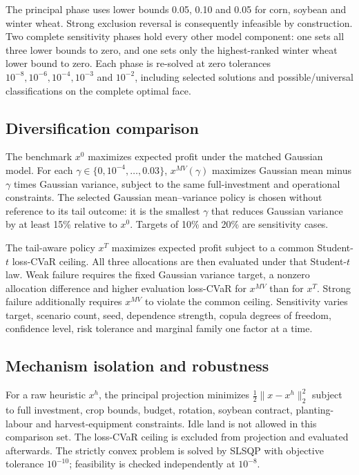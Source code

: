 The principal phase uses lower bounds 0.05, 0.10 and 0.05 for corn, soybean
and winter wheat. Strong exclusion reversal is consequently infeasible by
construction. Two complete sensitivity phases hold every other model
component: one sets all three lower bounds to zero, and one sets only the
highest-ranked winter wheat lower bound to zero. Each phase is re-solved at
zero tolerances \(10^{-8},10^{-6},10^{-4},10^{-3}\) and \(10^{-2}\), including
selected solutions and possible/universal classifications on the complete
optimal face.

\subsection{Diversification comparison}

The benchmark \(x^0\) maximizes expected profit under the matched Gaussian
model. For each \(\gamma\in\{0,10^{-4},\ldots,0.03\}\), \(x^{MV}(\gamma)\)
maximizes Gaussian mean minus \(\gamma\) times Gaussian variance, subject to
the same full-investment and operational constraints. The selected Gaussian
mean--variance policy is chosen without reference to its tail
outcome: it is
the smallest \(\gamma\) that reduces Gaussian variance by at least 15\%
relative to \(x^0\). Targets of 10\% and 20\% are sensitivity cases.

The tail-aware policy \(x^T\) maximizes expected profit subject to a common
Student-\(t\) loss-CVaR ceiling. All three allocations are then evaluated
under that Student-\(t\) law. Weak failure requires the fixed Gaussian
variance target, a nonzero allocation difference and higher evaluation
loss-CVaR for \(x^{MV}\) than for \(x^T\). Strong failure additionally
requires \(x^{MV}\) to violate the common ceiling. Sensitivity varies target,
scenario count, seed, dependence strength, copula degrees of freedom,
confidence level, risk tolerance and marginal family one factor at a time.

\subsection{Mechanism isolation and robustness}

For a raw heuristic \(x^h\), the principal projection minimizes
\(\frac12\lVert x-x^h\rVert_2^2\) subject to full investment, crop bounds,
budget, rotation, soybean contract, planting-labour and harvest-equipment
constraints. Idle land is not allowed in this comparison set. The loss-CVaR
ceiling is excluded from projection and evaluated afterwards. The strictly
convex problem is solved by SLSQP with objective tolerance \(10^{-10}\);
feasibility is checked independently at \(10^{-8}\).

